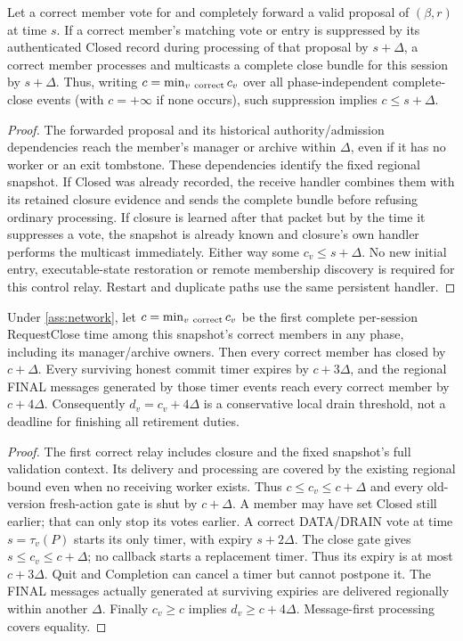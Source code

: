 \begin{proposition}
\label{prop:retirement-observable-close}
Let a correct member vote for and completely forward a valid proposal
of $(\beta,r)$ at time $s$. If a correct member's matching vote or entry
is suppressed by its authenticated Closed record during processing of
that proposal by $s+\Delta$, a correct member processes and multicasts
a complete close bundle for this session by $s+\Delta$. Thus, writing
$c=\min_{v\ {\rm correct}}c_v$ over all phase-independent complete-close
events (with $c=+\infty$ if none occurs), such suppression implies
$c\le s+\Delta$.
\end{proposition}
\begin{proof}
The forwarded proposal and its historical authority/admission dependencies
reach the member's manager or archive within $\Delta$, even if it has
no worker or an exit tombstone. These dependencies identify the fixed
regional snapshot. If Closed was already recorded, the receive handler
combines them with its retained closure evidence and sends the complete
bundle before refusing ordinary processing. If closure is learned after
that packet but by the time it suppresses a vote, the snapshot is already
known and closure's own handler performs the multicast immediately.
Either way some $c_v\le s+\Delta$. No new initial entry, executable-state
restoration or remote membership discovery is required for this control
relay. Restart and duplicate paths use the same persistent handler.
\end{proof}

\begin{proposition}
\label{prop:retirement-drain}
Under \cref{ass:network}, let $c=\min_{v\ {\rm correct}}c_v$ be the first
complete per-session RequestClose time among this snapshot's correct
members in any phase, including its manager/archive owners. Then every correct member has closed by $c+\Delta$.
Every surviving honest commit timer expires by $c+3\Delta$, and the
regional FINAL messages generated by those timer events reach every
correct member by $c+4\Delta$. Consequently $d_v=c_v+4\Delta$ is a
conservative local drain threshold, not a deadline for finishing all
retirement duties.
\end{proposition}
\begin{proof}
The first correct relay includes closure and the fixed snapshot's full
validation context. Its delivery and processing are covered by the
existing regional bound even when no receiving worker exists. Thus
$c\le c_v\le c+\Delta$ and every old-version fresh-action gate is shut
by $c+\Delta$. A member may have set Closed still earlier; that can only
stop its votes earlier. A correct DATA/DRAIN vote at time
$s=\tau_v(P)$ starts its only timer, with expiry $s+2\Delta$.
The close gate gives $s\le c_v\le c+\Delta$; no callback starts a
replacement timer. Thus its expiry is at most $c+3\Delta$.
Quit and Completion can cancel a timer but cannot postpone it.
The FINAL messages actually generated at surviving expiries are
delivered regionally within another $\Delta$. Finally $c_v\ge c$
implies $d_v\ge c+4\Delta$. Message-first processing covers equality.
\end{proof}

